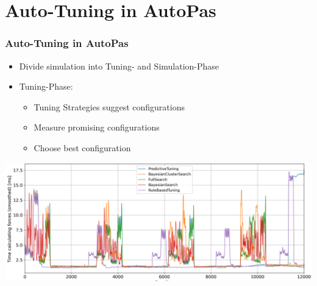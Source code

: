 \documentclass[
	10pt,
	t		%
]{beamer}
\begin{document}
\section{Auto-Tuning in AutoPas}

\begin{frame}
    \frametitle{Auto-Tuning in AutoPas}

    \begin{itemize}
        \item Divide simulation into Tuning- and Simulation-Phase
        \item Tuning-Phase:
              \begin{itemize}
                  \item Tuning Strategies suggest configurations
                  \item Measure promising configurations
                  \item Choose best configuration
              \end{itemize}
    \end{itemize}

    \begin{center}
        \includegraphics[width=1\textwidth]{figures/timing.png}
    \end{center}
\end{frame}
\end{document}
